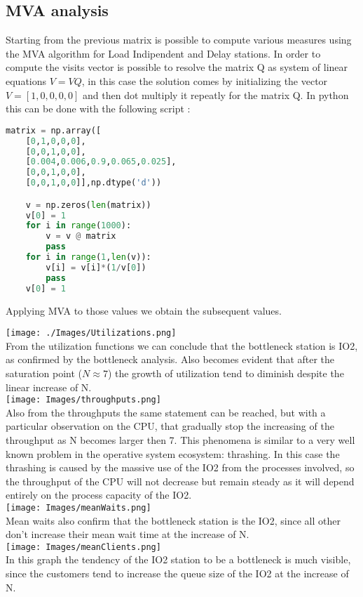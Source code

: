 \documentclass[12pt,a4paper]{article}
\begin{document}
\subsection{MVA analysis}
Starting from the previous matrix is possible to compute various measures using the MVA algorithm for Load Indipendent and Delay stations. In order to compute the visits vector is possible to resolve the matrix Q as system of linear equations $V=VQ$, in this case the solution comes by initializing the vector $V = [1,0,0,0,0]$ and then dot multiply it repeatly for the matrix Q. In python this can be done with the following script :\pagebreak
\begin{lstlisting}[language=python]
    matrix = np.array([
    [0,1,0,0,0],
    [0,0,1,0,0],
    [0.004,0.006,0.9,0.065,0.025],
    [0,0,1,0,0],
    [0,0,1,0,0]],np.dtype('d'))

    v = np.zeros(len(matrix))
    v[0] = 1
    for i in range(1000):
        v = v @ matrix
        pass
    for i in range(1,len(v)):
        v[i] = v[i]*(1/v[0])
        pass
    v[0] = 1
    \end{lstlisting}
Applying MVA to those values we obtain the subsequent values.

\texttt{[image: ./Images/Utilizations.png]}\\
From the utilization functions we can conclude that the bottleneck station is IO2, as confirmed by the bottleneck analysis. Also becomes evident that after the saturation point ($N \approx7$) the growth of utilization tend to diminish despite the linear increase of N.
\\
\texttt{[image: Images/throughputs.png]}
\\
Also from the throughputs the same statement can be reached, but with a particular observation on the CPU, that gradually stop the increasing of the throughput as N becomes larger then 7. This phenomena is similar to a very well known problem in the operative system ecosystem: thrashing. In this case the thrashing is caused by the massive use of the IO2 from the processes involved, so the throughput of the CPU will not decrease but remain steady as it will depend entirely on the process capacity of the IO2.
\\
\texttt{[image: Images/meanWaits.png]}
\\
Mean waits also confirm that the bottleneck station is the IO2, since all other don't increase their mean wait time at the increase of N.
\\
\texttt{[image: Images/meanClients.png]}
\\
In this graph the tendency of the IO2 station to be a bottleneck is much visible, since the customers tend to increase the queue size of the IO2 at the increase of N.
\end{document}
